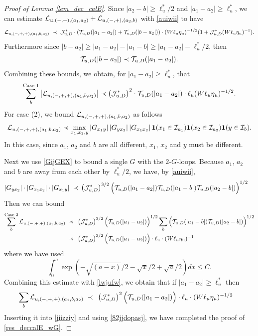 \documentclass[10pt,reqno]{article}
\theoremstyle{plain} %
\theoremstyle{remark}
\numberwithin{equation}{section}
\begin{document}
\begin{proof}[Proof of Lemma \ref{lem_dec_calE}]
 Since $|a_2-b|\ge \ell_u^*/2$ and $|a_1-a_2|\ge  \ell_u^*$,  we can estimate  $ {\cal L}_{u, (-,+),(a_1, a_2)}   + {\cal L}_{u, (-,+),(a_2, b)}$ 
with \eqref{auiwii} to have  
$$
 {\cal L}_{u, (-,+,+),(a_1, b , a_2)} \;\prec\; {\cal J}^*_{u,D}\cdot \left(  {\cal T}_{u,D}(|a_1-a_2|)+{\cal T}_{u,D}(|b-a_2|) \right)  \cdot (W\ell_u\eta_u)^{-1/2}(1+{\cal J}^*_{u,D}(W\ell_u\eta_u)^{-1}).
 $$
Furthermore since $|b-a_2|\ge |a_1-a_2|-|a_1-b|\ge |a_1-a_2|-\ell_u^*/2$, then
$${\cal T}_{u,D}(|b-a_2|) \prec  {\cal T}_{u,D}(|a_1-a_2|).
$$
Combining these bounds,  we obtain,   for $|a_1-a_2|\ge \ell_u^*$, that  
\begin{align}
    \label{lwjufw}
    \sum_{b } ^{\text{Case } 1} \left|{\cal L}_{u, (-,+,+),(a_1, b , a_2)}\right|\prec \left({\cal J}^*_{u,D}\right)^2\cdot{\cal T}_{u,D}(|a_1-a_2|) \cdot \ell_u(W\ell_u\eta_u)^{-1/2} .
\end{align}
For case (2),  we bound  ${\cal L}_{u, (-,+,+),(a_1, b , a_2)}$ as follows
\begin{align}\label{LGGGXXX}
{\cal L}_{u, (-,+,+),(a_1, b , a_2)}
\prec \max_{x_1,x_2, y} \left|G_{x_1y}\right| \left|G_{yx_2}\right|\left|G_{x_1x_2}\right|{\bf 1}(x_1\in {\cal I}_{a_1}){\bf 1}(x_2\in {\cal I}_{a_2}){\bf 1}(y\in {\cal I}_{b}).
\end{align}
 In this case, since $a_1$, $a_2$ and $b$ are all different,  $x_1$, $x_2$ and $y$ must be different.  
 
 
 Next we use   \eqref{GijGEX} to bound a single $G$ with the $2$-$G$-loops.   Because $a_1$, $a_2$ and $b$ are away from each other by $\ell_u^*/2$, we have, by  \eqref{auiwii}, 
 \begin{align}\label{GGTLJ}
 \left|G_{yx_2}\right|\cdot \left|G_{x_1x_2}\right| \cdot
\left|G_{x_1y}\right|
\;\prec \; & \left({\cal J}^*_{u,D}\right)^{3/2} \Big( {\cal T}_{u,D}(|a_1-a_2|) {\cal T}_{u,D}(|a_1-b|){\cal T}_{u,D}(|a_2-b|)\Big)^{1/2}
 \end{align}
Then we can bound 
\begin{align}
    \sum_{b}^{ \text {Case } 2 }{\cal L}_{u, (-,+,+),(a_1, b , a_2)} 
 \;\prec \;  &\;\left({\cal J}^*_{u,D}\right)^{3/2}\Big( {\cal T}_{u,D}(|a_1-a_2|)\Big)^{1/2} \sum_b \Big({\cal T}_{u,D}(|a_1-b|){\cal T}_{u,D}(|a_2-b|)\Big)^{1/2}
 \nonumber \\
  \;\prec \; &\;\left({\cal J}^*_{u,D}\right)^{3/2}\Big( {\cal T}_{u,D}(|a_1-a_2|)\Big) \cdot  \ell_u\cdot  (W\ell_u\eta_u)^{-1}
\end{align}
where we have used
$$
\int_{0 }^a\exp\left(-\sqrt{(a-x)}/2-\sqrt x/2+ \sqrt a/2\right)dx\le C .
$$
Combining  this estimate with \eqref{lwjufw}, we obtain that if $|a_1-a_2|\ge \ell_u^*$ then
\begin{align}
    \sum_{b} {\cal L}_{u, (-,+,+),(a_1, b , a_2)} 
  \;\prec \; &\;\left({\cal J}^*_{u,D}\right)^2\Big( {\cal T}_{u,D}(|a_1-a_2|)\Big) \cdot  \ell_u\cdot  (W\ell_u\eta_u)^{-1/2}
\end{align}
Inserting  it into \eqref{jiizziy} and using  \eqref{82jjdopasj}, we have completed the proof of  \eqref{res_deccalE_wG}.


\end{proof}
\end{document}
